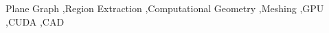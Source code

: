 \documentclass[a4paper,fleqn]{cas-sc}
\begin{document}
\begin{keywords}
Plane Graph \sep Region Extraction \sep  Computational Geometry \sep Meshing \sep GPU \sep CUDA \sep CAD
\end{keywords}


\maketitle













%








\end{document}
